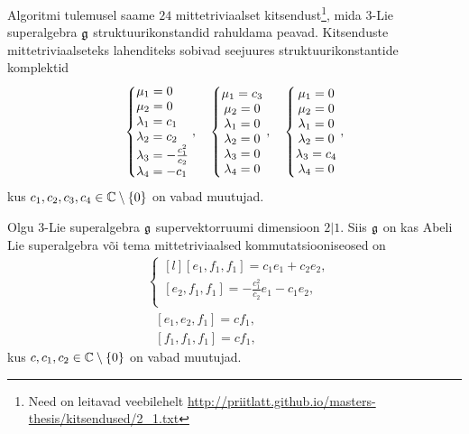 Algoritmi tulemusel saame $24$ mittetriviaalset kitsendust\footnote{
Need on leitavad veebilehelt
\url{http://priitlatt.github.io/masters-thesis/kitsendused/2_1.txt}},
mida $3$-Lie superalgebra $\mathfrak{g}$ struktuurikonstandid rahuldama peavad.
Kitsenduste mittetriviaalseteks lahenditeks sobivad seejuures
struktuurikonstantide komplektid
\renewcommand\arraystretch{1.3}
\begin{align*}
    \left\{ \begin{matrix*}[l]
        \m_1 = 0 \\
        \m_2 = 0 \\
        \l_1 = c_1 \\
        \l_2 = c_2 \\
        \l_3 = -\frac{c_1^2}{c_2} \\
        \l_4 = -c_1 \\
    \end{matrix*} \right.,
    \quad
    \left\{ \begin{matrix*}
        \m_1 = c_3 \\
        \m_2 = 0 \\
        \l_1 = 0 \\
        \l_2 = 0 \\
        \l_3 = 0 \\
        \l_4 = 0 \\
    \end{matrix*} \right.,
    \quad
    \left\{ \begin{matrix*}
        \m_1 = 0 \\
        \m_2 = 0 \\
        \l_1 = 0 \\
        \l_2 = 0 \\
        \l_3 = c_4 \\
        \l_4 = 0 \\
    \end{matrix*} \right.,
\end{align*}
\renewcommand\arraystretch{1}
kus $c_1, c_2, c_3, c_4 \in \mathbb{C} \setminus \{0\}$ on vabad muutujad.

\begin{thm}
    Olgu $3$-Lie superalgebra $\mathfrak{g}$ supervektorruumi dimensioon $2|1$.
    Siis $\mathfrak{g}$ on kas Abeli Lie superalgebra või tema mittetriviaalsed
    kommutatsiooniseosed on
    \renewcommand\arraystretch{1.2}
    \begin{align}
        & \left\{
            \begin{matrix*}[l]
                [e_1, f_1, f_1] = c_1 e_1 + c_2 e_2, \\
                [e_2, f_1, f_1] = -\frac{c_1^2}{c_2} e_1 - c_1 e_2, \\
            \end{matrix*}
        \right. \\[0.2cm]
        &\ \ \ [e_1, e_2, f_1] = c f_1, \\[0.2cm]
        &\ \ \ [f_1, f_1, f_1] = c f_1,
    \end{align}
    \renewcommand\arraystretch{1}
    kus $c, c_1, c_2 \in \mathbb{C} \setminus \{ 0 \}$ on vabad muutujad.
\end{thm}

